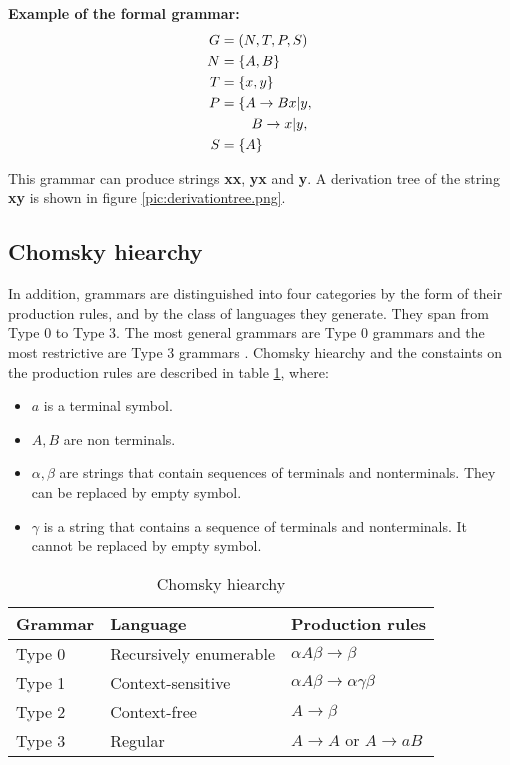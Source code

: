   \textbf{Example of the formal grammar:}
  \begin{align*}
      G &= (N, T, P, S) \\
      N &= \{A, B\} \\
      T &= \{x, y\} \\
      P &= \{ A \rightarrow Bx | y, \\
      &\hspace{8 mm} B \rightarrow x | y, \\
      S &= \{A\}
  \end{align*}

  This grammar can produce strings \textbf{xx}, \textbf{yx} and \textbf{y}. A derivation tree of the string \textbf{xy} is shown in figure \ref{pic:derivationtree.png}.




  \subsection{Chomsky hiearchy}
  In addition, grammars are distinguished into four categories by the form of their production rules, and by the class of languages they generate. They span from Type 0 to Type 3. The most general grammars are Type 0 grammars and the most restrictive are Type 3 grammars \cite{formal-grammar}. Chomsky hiearchy and the constaints on the production rules are described in table \ref{table:chomsky-hiearchy}, where:

  \begin{itemize}
    \item $a$ is a terminal symbol.
    \item $A, B$ are non terminals.
    \item $\alpha, \beta$ are strings that contain sequences of terminals and nonterminals. They can be replaced by empty symbol.
    \item $\gamma$ is a string that contains a sequence of terminals and nonterminals. It cannot be replaced by empty symbol.
  \end{itemize}

  \begin{table}[htbp]
        \centering
        \caption{Chomsky hiearchy}
        \label{table:chomsky-hiearchy}
            \begin{tabular}{| l | l | l |}
            \hline
                \textbf{Grammar} & \textbf{Language} & \textbf{Production rules} \\
            \toprule
  \hline Type 0 & Recursively enumerable & $\alpha A \beta \rightarrow \beta$ \\
  \hline Type 1 & Context-sensitive & $\alpha A \beta \rightarrow \alpha \gamma \beta$ \\
  \hline Type 2 & Context-free & $A \rightarrow \beta$ \\
  \hline Type 3 & Regular & $A \rightarrow A \text{ or } A \rightarrow aB $\\\hline
            \end{tabular}
  \end{table}

